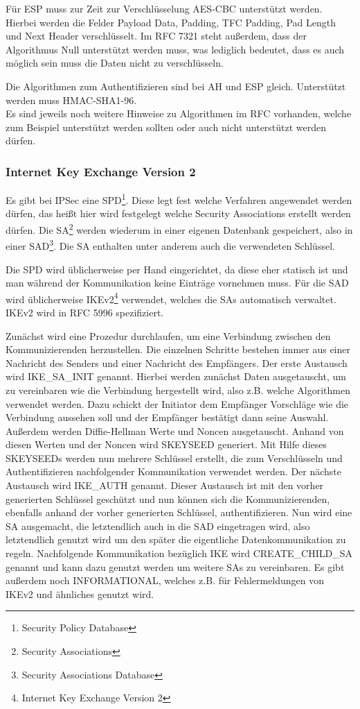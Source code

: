 \documentclass[12pt]{scrartcl}
\begin{document}
Für ESP muss zur Zeit zur Verschlüsselung AES-CBC unterstützt werden. Hierbei werden die Felder Payload Data, Padding, TFC Padding, Pad Length und Next Header verschlüsselt. Im RFC 7321 steht außerdem, dass der Algorithmus Null unterstützt werden muss, was lediglich bedeutet, dass es auch möglich sein muss die Daten nicht zu verschlüsseln.

Die Algorithmen zum Authentifizieren sind bei AH und ESP gleich. Unterstützt werden muss HMAC-SHA1-96.\\
Es sind jeweils noch weitere Hinweise zu Algorithmen im RFC vorhanden, welche zum Beispiel unterstützt werden sollten oder auch nicht unterstützt werden dürfen. 
\subsubsection{Internet Key Exchange Version 2}
Es gibt bei IPSec eine SPD\footnote{Security Policy Database}. Diese legt fest welche Verfahren angewendet werden dürfen, das heißt hier wird festgelegt welche Security Associations erstellt werden dürfen. Die SA\footnote{Security Associations} werden wiederum in einer eigenen Datenbank gespeichert, also in einer SAD\footnote{Security Associations Database}. Die SA enthalten unter anderem auch die verwendeten Schlüssel.

Die SPD wird üblicherweise per Hand eingerichtet, da diese eher statisch ist und man während der Kommunikation keine Einträge vornehmen muss. Für die SAD wird üblicherweise IKEv2\footnote{Internet Key Exchange Version 2} verwendet, welches die SAs automatisch verwaltet. IKEv2 wird in RFC 5996 spezifiziert.\cite{RFC5996}

Zunächst wird eine Prozedur durchlaufen, um eine Verbindung zwischen den Kommunizierenden herzustellen. Die einzelnen Schritte bestehen immer aus einer Nachricht des Senders und einer Nachricht des Empfängers. Der erste Austausch wird IKE\_SA\_INIT genannt. Hierbei werden zunächst Daten ausgetauscht, um zu vereinbaren wie die Verbindung hergestellt wird, also z.B. welche Algorithmen verwendet werden. Dazu schickt der Initiator dem Empfänger Vorschläge wie die Verbindung aussehen soll und der Empfänger bestätigt dann seine Auswahl. Außerdem werden Diffie-Hellman Werte und Noncen ausgetauscht. Anhand von diesen Werten und der Noncen wird SKEYSEED generiert. Mit Hilfe dieses SKEYSEEDs werden nun mehrere Schlüssel erstellt, die zum Verschlüsseln und Authentifizieren nachfolgender Kommunikation verwendet werden. Der nächste Austausch wird IKE\_AUTH genannt. Dieser Austausch ist mit den vorher generierten Schlüssel geschützt und nun können sich die Kommunizierenden, ebenfalls anhand der vorher generierten Schlüssel, authentifizieren. Nun wird eine SA ausgemacht, die letztendlich auch in die SAD eingetragen wird, also letztendlich genutzt wird um den später die eigentliche Datenkommunikation zu regeln.
Nachfolgende Kommunikation bezüglich IKE wird CREATE\_CHILD\_SA genannt und kann dazu genutzt werden um weitere SAs zu vereinbaren. Es gibt außerdem noch INFORMATIONAL, welches z.B. für Fehlermeldungen von IKEv2 und ähnliches genutzt wird.
\end{document}
